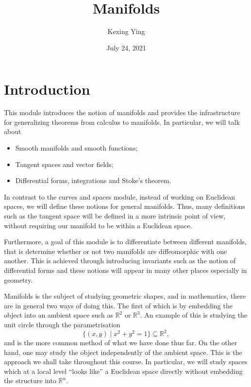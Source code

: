 \documentclass[]{article}
\title{Manifolds}
\author{Kexing Ying}
\date{July 24, 2021}
\theoremstyle{definition}
\theoremstyle{definition}
\begin{document}
\maketitle

{
\hypersetup{linkcolor=}
\setcounter{tocdepth}{2}
\tableofcontents
}
\newpage

\section{Introduction}

This module introduces the notion of manifolds and provides the infrastructure 
for generalizing theorems from calculus to manifolds. In particular, we will 
talk about 
\begin{itemize}
  \item Smooth manifolds and smooth functions;
  \item Tangent spaces and vector fields;
  \item Differential forms, integrations and Stoke's theorem.
\end{itemize}
In contrast to the curves and spaces module, instead of working on Euclidean spaces, 
we will define these notions for general manifolds. Thus, many definitions 
such as the tangent space will be defined in a more intrinsic point of view, without 
requiring our manifold to be within a Euclidean space.

Furthermore, a goal of this module is to differentiate between different manifolds, 
that is determine whether or not two manifolds are diffeomorphic with one another. 
This is achieved through introducing invariants such as the notion of differential 
forms and these notions will appear in many other places especially in geometry.

Manifolds is the subject of studying geometric shapes, and in mathematics, there 
are in general two ways of doing this. The first of which is by embedding the 
object into an ambient space such as \(\mathbb{R}^2\) or \(\mathbb{R}^3\). An 
example of this is studying the unit circle through the parametrisation 
\[\{(x, y) \mid x^2 + y^2 = 1\} \subseteq \mathbb{R}^2,\]
and is the more common method of what we have done thus far. On the other hand, 
one may study the object independently of the ambient space. This is the approach 
we shall take throughout this course. In particular, we will study spaces 
which at a local level ``looks like'' a Euclidean space directly without embedding 
the structure into \(\mathbb{R}^n\).

\newpage
\end{document}
